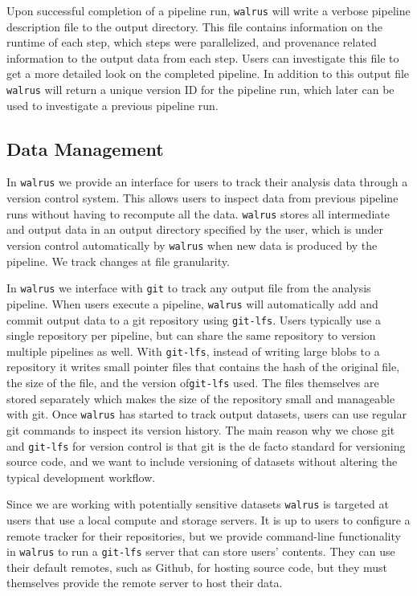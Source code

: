 Upon successful completion of a pipeline run, \texttt{walrus} will write a
verbose pipeline description file to the output directory. This file contains
information on the runtime of each step, which steps were parallelized, and
provenance related information to the output data from each step. Users can
investigate this file to get a more detailed look on the completed pipeline. In
addition to this output file \texttt{walrus} will return a unique version ID for
the pipeline run, which later can be used to investigate a previous pipeline
run.


\subsection{Data Management}
In \texttt{walrus} we provide an interface for users to track their analysis
data through a version control system. 
This allows users to inspect data from previous pipeline runs without having to
recompute all the data. \texttt{walrus} stores all intermediate and output data
in an output directory specified by the user, which is under version control
automatically by \texttt{walrus} when new data is produced by the pipeline. We
track changes at file granularity. 

In \texttt{walrus} we interface with \texttt{git} to track any output file from
the analysis pipeline. When users execute a pipeline, \texttt{walrus} will
automatically add and commit output data to a git repository using
\texttt{git-lfs}.  Users typically use a single repository per pipeline, but can
share the same repository to version multiple pipelines as well. With
\texttt{git-lfs}, instead of writing large blobs to a repository it writes small
pointer files that contains the hash of the original file, the size of the file,
and the version of\texttt{git-lfs} used. The files themselves are stored
separately which makes the size of the repository small and manageable with git.
Once \texttt{walrus} has started to track output datasets, users can use regular
git commands to inspect its version history. 
The main reason why we chose git and \texttt{git-lfs} for version control is
that git is the de facto standard for versioning source code, and we want to
include versioning of datasets without altering the typical development
workflow. 

Since we are working with potentially sensitive datasets \texttt{walrus} is
targeted at users that use a local compute and storage servers. It is up to
users to configure a remote tracker for their repositories, but we provide
command-line functionality in \texttt{walrus} to run a \texttt{git-lfs} server
that can store users' contents.  They can use their default remotes, such as
Github, for hosting source code, but they must themselves provide the remote
server to host their data.

